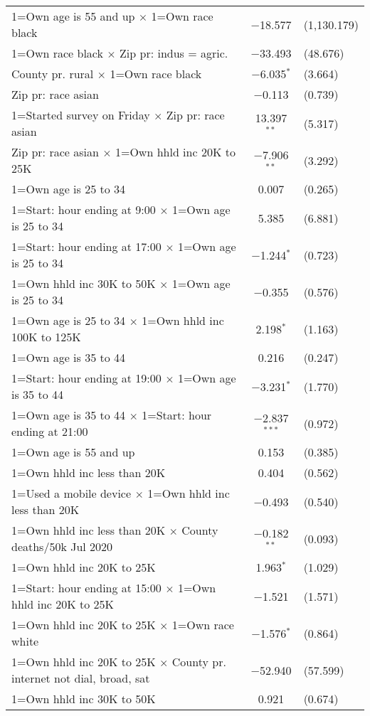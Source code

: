 \begin{table}[!htbp]
\begin{tabular}{@{\extracolsep{5pt}}lc}
  1=Own age is 55 and up  $\times$ 1=Own race black & $-$18.577 & (1,130.179) \\ 
  1=Own race black $\times$ Zip pr: indus = agric. & $-$33.493 & (48.676) \\ 
  County pr. rural $\times$ 1=Own race black & $-$6.035$^{*}$ & (3.664) \\ 
  Zip pr: race asian & $-$0.113 & (0.739) \\ 
  1=Started survey on Friday $\times$ Zip pr: race asian & 13.397$^{**}$ & (5.317) \\ 
  Zip pr: race asian $\times$ 1=Own hhld inc 20K to 25K & $-$7.906$^{**}$ & (3.292) \\ 
  1=Own age is 25 to 34 & 0.007 & (0.265) \\ 
  1=Start: hour ending at 9:00 $\times$ 1=Own age is 25 to 34 & 5.385 & (6.881) \\ 
  1=Start: hour ending at 17:00 $\times$ 1=Own age is 25 to 34 & $-$1.244$^{*}$ & (0.723) \\ 
  1=Own hhld inc 30K to 50K $\times$ 1=Own age is 25 to 34 & $-$0.355 & (0.576) \\ 
  1=Own age is 25 to 34 $\times$ 1=Own hhld inc 100K to 125K & 2.198$^{*}$ & (1.163) \\ 
  1=Own age is 35 to 44 & 0.216 & (0.247) \\ 
  1=Start: hour ending at 19:00 $\times$ 1=Own age is 35 to 44 & $-$3.231$^{*}$ & (1.770) \\ 
  1=Own age is 35 to 44 $\times$ 1=Start: hour ending at 21:00 & $-$2.837$^{***}$ & (0.972) \\ 
  1=Own age is 55 and up  & 0.153 & (0.385) \\ 
  1=Own hhld inc less than 20K & 0.404 & (0.562) \\ 
  1=Used a mobile device $\times$ 1=Own hhld inc less than 20K & $-$0.493 & (0.540) \\ 
  1=Own hhld inc less than 20K $\times$ County deaths/50k Jul 2020 & $-$0.182$^{**}$ & (0.093) \\ 
  1=Own hhld inc 20K to 25K & 1.963$^{*}$ & (1.029) \\ 
  1=Start: hour ending at 15:00 $\times$ 1=Own hhld inc 20K to 25K & $-$1.521 & (1.571) \\ 
  1=Own hhld inc 20K to 25K $\times$ 1=Own race white & $-$1.576$^{*}$ & (0.864) \\ 
  1=Own hhld inc 20K to 25K $\times$ County pr. internet not dial, broad, sat & $-$52.940 & (57.599) \\ 
  1=Own hhld inc 30K to 50K & 0.921 & (0.674) \\ 

\end{tabular}
\end{table}
